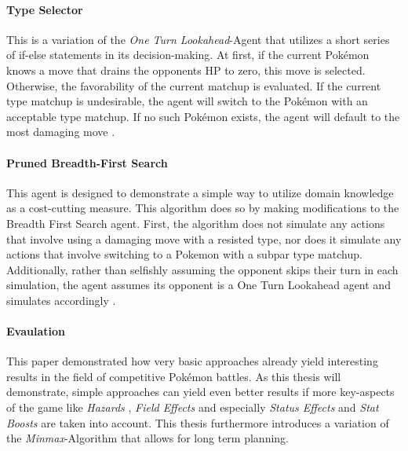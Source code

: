 \paragraph{Type Selector}
This is a variation of the \textit{One Turn Lookahead}-Agent that utilizes a short series of
if-else statements in its decision-making. At first, if the current Pokémon knows a move 
that drains the opponents \ac{HP} to zero, this move is selected. Otherwise, the 
favorability of the current matchup is evaluated. If the current type matchup is 
undesirable, the agent will switch to the Pokémon with an acceptable type matchup. If no
such Pokémon exists, the agent will default to the most damaging move 
\cite{Lee_Togelius_2017}.

\paragraph{Pruned Breadth-First Search}
This agent is designed to demonstrate a simple way to utilize domain knowledge as a cost-cutting 
measure. This algorithm does so by making modifications to the Breadth First Search agent. First, 
the algorithm does not simulate any actions that involve using a damaging move with a resisted type, 
nor does it simulate any actions that involve switching to a Pokemon with a subpar type matchup. 
Additionally, rather than selfishly assuming the opponent skips their turn in each simulation, the 
agent assumes its opponent is a One Turn Lookahead agent and simulates accordingly
\cite{Lee_Togelius_2017}.

\paragraph{Evaulation}
This paper demonstrated how very basic approaches already yield interesting results in the 
field of competitive Pokémon battles. As this thesis will demonstrate, simple approaches can 
yield even better results if more key-aspects of the game like \textit{Hazards} ,
\textit{Field Effects}  and especially \textit{Status Effects}
 and \textit{Stat Boosts} are taken into account. This thesis furthermore
introduces a variation of the \textit{Minmax}-Algorithm that allows for long term planning.